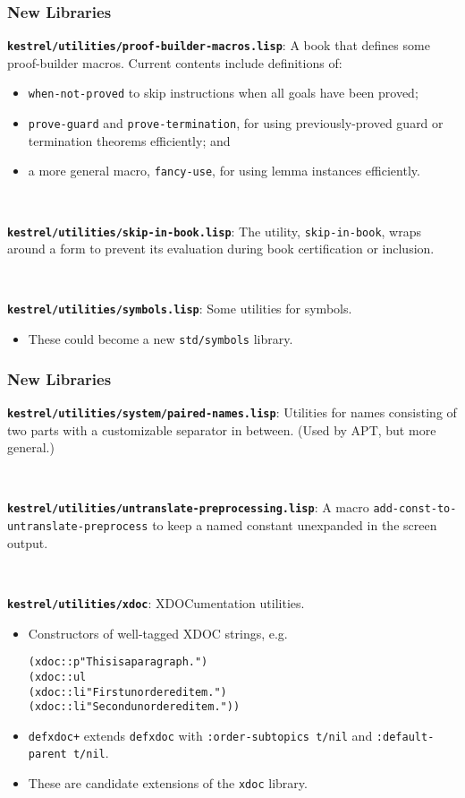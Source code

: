\documentclass{beamer}
\newcommand{\code}[1]{\texttt{#1}}
\newenvironment{codeblock}{\begin{alltt}}{\end{alltt}}
\newcommand{\bookpath}[1]{\textbf{\code{#1}}}
\newcommand{\newlibtitle}{\frametitle{New Libraries}}
\begin{document}

\begin{frame}

\newlibtitle

\bookpath{kestrel/utilities/proof-builder-macros.lisp}:
A book that defines some proof-builder macros.  Current contents
include definitions of:
\begin{itemize}
\item
\code{when-not-proved} to skip instructions when all goals have
been proved;
\item
\code{prove-guard} and \code{prove-termination}, for using
previously-proved guard or termination theorems efficiently; and
\item
a more general macro, \code{fancy-use}, for using lemma
instances efficiently.
\end{itemize}

\

\bookpath{kestrel/utilities/skip-in-book.lisp}:
The utility, \code{skip-in-book}, wraps around a form to prevent its
evaluation during book certification or inclusion.

\

\bookpath{kestrel/utilities/symbols.lisp}:
Some utilities for symbols.
\begin{itemize}
\item
These could become a new \code{std/symbols} library.
\end{itemize}

\end{frame}


\begin{frame}[fragile]

\newlibtitle

\bookpath{kestrel/utilities/system/paired-names.lisp}:
Utilities for names consisting of
two parts with a customizable separator in between.
(Used by APT, but more general.)

\

\bookpath{kestrel/utilities/untranslate-preprocessing.lisp}:
A macro \code{add-const-to-untranslate-preprocess}
to keep a named constant unexpanded in the screen output.

\

\bookpath{kestrel/utilities/xdoc}:
XDOCumentation utilities.
\begin{itemize}
\item
Constructors of well-tagged XDOC strings, e.g.
\begin{codeblock}
(xdoc::p "This is a paragraph.")
(xdoc::ul
  (xdoc::li "First unordered item.")
  (xdoc::li "Second unordered item."))
\end{codeblock}
\item
\code{defxdoc+} extends \code{defxdoc} with
\code{:order-subtopics t/nil} and \code{:default-parent t/nil}.
\item
These are candidate extensions of the \code{xdoc} library.
\end{itemize}

\end{frame}
\end{document}
